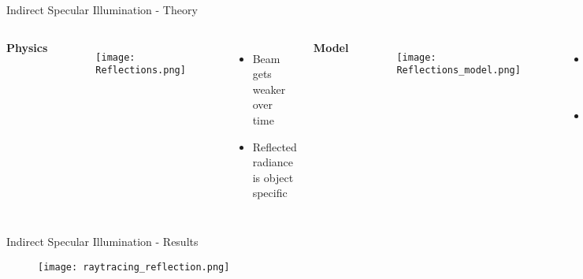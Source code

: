     \begin{frame}{Indirect Specular Illumination - Theory}
        \begin{columns}[T]
            \textbf{Physics}
            
            \begin{figure}
                \centering
                \texttt{[image: Reflections.png]}
            \end{figure}
            
            \pause
            \begin{itemize}
                \item Beam gets weaker over time
                \pause
                \item Reflected radiance is object specific
            \end{itemize}
            
            \textbf{Model}

            \pause
            \begin{figure}
                \centering
                \texttt{[image: Reflections\_model.png]}
            \end{figure}

            \pause
            \begin{itemize}
                \item Maximum reflection depth
                \pause
                \item Object specific reflection coefficient
            \end{itemize}

            \pause
            \begin{equation*}
                \text{Pixel} = (L_t + L_0) \cdot \text{Color} + c_r \cdot L_r
            \end{equation*}
        \end{columns}
    \end{frame}

    \begin{frame}{Indirect Specular Illumination - Results}
        \begin{figure}
            \centering
            \texttt{[image: raytracing\_reflection.png]}
        \end{figure}
    \end{frame}